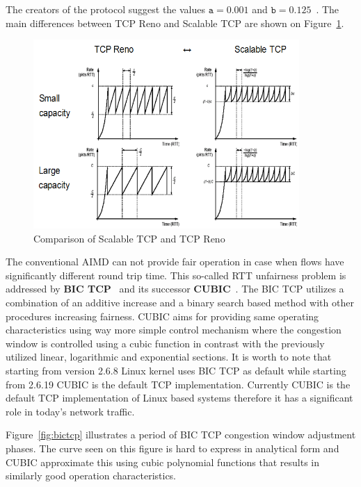 \documentclass[a4paper]{article}
\begin{document}
The creators of the protocol suggest the values $\texttt{a}=0.001$ and $\texttt{b}=0.125$~\cite{ScalableTCP}. The main
differences between TCP Reno and Scalable TCP are shown on Figure~\ref{fig:ScalableVSReno}.

\begin{figure}[H]
    \centering
    \includegraphics[width=0.9\textwidth]{figures/ScalableTCP.png}
    \caption{Comparison of Scalable TCP and TCP Reno}
    \label{fig:ScalableVSReno}
\end{figure}

The conventional AIMD can not provide fair operation in case when flows have significantly different round trip time.
This so-called RTT unfairness problem is addressed by \textbf{BIC TCP}~\cite{BICTCP} and its successor
\textbf{CUBIC}~\cite{CUBIC}. The BIC TCP utilizes a combination of an additive increase and a binary search based
method with other procedures increasing fairness. CUBIC aims for providing same operating characteristics using way more
simple control mechanism where the congestion window is controlled using a cubic function in contrast with the
previously utilized linear, logarithmic and exponential sections. It is worth to note that starting from version 2.6.8
Linux kernel uses BIC TCP as default while starting from 2.6.19 CUBIC is the default TCP implementation. Currently
CUBIC is the default TCP implementation of Linux based systems therefore it has a significant role in today's network
traffic.

Figure~\ref{fig:bictcp} illustrates a period of BIC TCP congestion window adjustment phases. The curve seen on this
figure is hard to express in analytical form and CUBIC approximate this using cubic polynomial functions that results
in similarly good operation characteristics.
\end{document}
